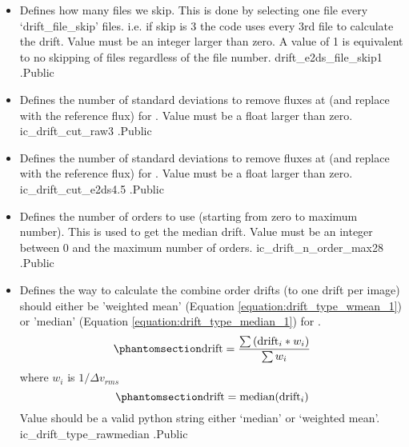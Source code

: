 \begin{itemize}
\item {}
{Defines how many files we skip. This is done by selecting one file every `drift\_file\_skip' files. i.e. if skip is 3 the code uses every 3rd file to calculate the drift. Value must be an integer larger than zero. A value of 1 is equivalent to no skipping of files regardless of the file number.}
{drift\_e2ds\_file\_skip}{1}
{\calDRIFTE}{\constantsfile}{\calDRIFTE.\progMAIN}{Public}


\item {}
{Defines the number of standard deviations to remove fluxes at (and replace with the reference flux) for \calDRIFTRAW. Value must be a float larger than zero.}
{ic\_drift\_cut\_raw}{3}
{\calDRIFTRAW}{\constantsfile}{\calDRIFTRAW.\progMAIN}{Public}


\item {}
{Defines the number of standard deviations to remove fluxes at (and replace with the reference flux) for \calDRIFTE. Value must be a float larger than zero.}
{ic\_drift\_cut\_e2ds}{4.5}
{\calDRIFTE}{\constantsfile}{\calDRIFTE.\progMAIN}{Public}


\item {}
{Defines the number of orders to use (starting from zero to maximum number). This is used to get the median drift. Value must be an integer between 0 and the maximum number of orders.}
{ic\_drift\_n\_order\_max}{28}
{\calDRIFTRAW}{\constantsfile}{\calDRIFTRAW.\progMAIN}{Public}


\item {}
{Defines the way to calculate the combine order drifts (to one drift per image) should either be 'weighted mean' (Equation \ref{equation:drift_type_wmean_1}) or 'median' (Equation \ref{equation:drift_type_median_1}) for \calDRIFTRAW.
\begin{equation}
\namedlabel{equation:drift_type_wmean_1}
\text{drift} = \frac{\sum{(\text{drift}_i * w_i)}}{\sum{w_i}}
\end{equation}
\noindent where $w_i$ is $1/\Delta v_{rms}$
\begin{equation}
\namedlabel{equation:drift_type_median_1}
\text{drift} = \text{median}(\text{drift}_i)
\end{equation}
\noindent Value should be a valid python string either `median' or `weighted mean'.
}
{ic\_drift\_type\_raw}{median}
{\calDRIFTRAW}{\constantsfile}{\calDRIFTRAW.\progMAIN}{Public}



\end{itemize}

